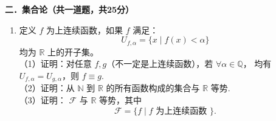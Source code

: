 \textbf{二．集合论（共一道题，共25分）}
\begin{enumerate}
\item 定义 $f$ 为上连续函数，如果 $f$ 满足：
$$U_{f, \alpha}=\{x \mid f(x)<\alpha\}$$
均为 $\mathbb{R}$ 上的开子集。\\
（1）证明：对任意 $f, g$（不一定是上连续函数），若 $\forall \alpha \in \mathbb{Q}$，
均有 $U_{f, \alpha}=U_{g, \alpha}$，则 $f \equiv g$.\\
（2）证明：从 $\mathbb{N}$ 到 $\mathbb{R}$ 的所有函数构成的集合与 $\mathbb{R}$ 等势.\\
（3）证明： $\mathcal{F}$ 与 $\mathbb{R}$ 等势，其中
$$\mathcal{F}=\{f \mid f \text { 为上连续函数 }\}.$$
\end{enumerate}